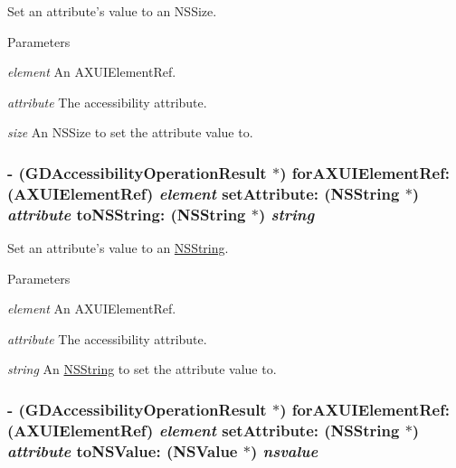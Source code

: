 Set an attribute's value to an NSSize. 
\begin{DoxyParams}{Parameters}
\item[{\em element}]An AXUIElementRef. \item[{\em attribute}]The accessibility attribute. \item[{\em size}]An NSSize to set the attribute value to. \end{DoxyParams}
\hypertarget{interface_g_d_accessibility_manager_a47b117c336fb6627353a74ab78cdd6a1}{
\subsubsection[{forAXUIElementRef:setAttribute:toNSString:}]{\setlength{\rightskip}{0pt plus 5cm}-\/ ({\bf GDAccessibilityOperationResult} $\ast$) forAXUIElementRef: (AXUIElementRef) {\em element}\/ setAttribute: ({\bf NSString} $\ast$) {\em attribute}\/ toNSString: ({\bf NSString} $\ast$) {\em string}}}
\label{interface_g_d_accessibility_manager_a47b117c336fb6627353a74ab78cdd6a1}


Set an attribute's value to an \hyperlink{class_n_s_string}{NSString}. 
\begin{DoxyParams}{Parameters}
\item[{\em element}]An AXUIElementRef. \item[{\em attribute}]The accessibility attribute. \item[{\em string}]An \hyperlink{class_n_s_string}{NSString} to set the attribute value to. \end{DoxyParams}
\hypertarget{interface_g_d_accessibility_manager_a9a03f4ae6cc68077a661f139293ba9cc}{
\subsubsection[{forAXUIElementRef:setAttribute:toNSValue:}]{\setlength{\rightskip}{0pt plus 5cm}-\/ ({\bf GDAccessibilityOperationResult} $\ast$) forAXUIElementRef: (AXUIElementRef) {\em element}\/ setAttribute: ({\bf NSString} $\ast$) {\em attribute}\/ toNSValue: (NSValue $\ast$) {\em nsvalue}}}
\label{interface_g_d_accessibility_manager_a9a03f4ae6cc68077a661f139293ba9cc}


